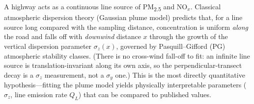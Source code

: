 \documentclass[11pt, letterpaper]{article}
\begin{document}
A highway acts as a continuous line source of PM\textsubscript{2.5} and NO$_x$. Classical
atmospheric dispersion theory (Gaussian plume model) predicts that, for a line source
long compared with the sampling distance, concentration is uniform \emph{along} the road
and falls off with \emph{downwind} distance $x$ through the growth of the vertical
dispersion parameter $\sigma_z(x)$, governed by
Pasquill--Gifford (PG) atmospheric stability classes. (There is no cross-wind fall-off
to fit: an infinite line source is translation-invariant along its own axis, so the
perpendicular-transect decay is a $\sigma_z$ measurement, not a $\sigma_y$ one.)
This is the most directly quantitative
hypothesis---fitting the plume model yields physically interpretable parameters
($\sigma_z$, line emission rate $Q_L$) that can be compared to published values.
\end{document}
